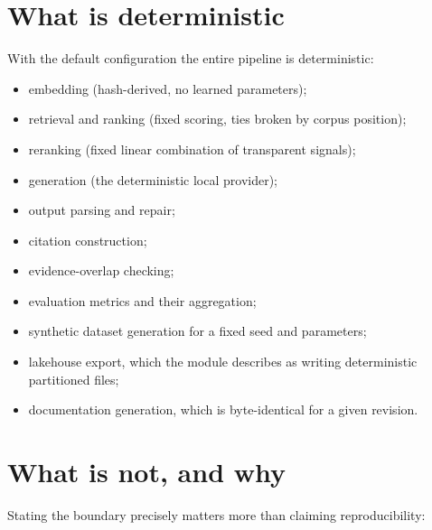 \section{What is deterministic}

With the default configuration the entire pipeline is deterministic:

\begin{itemize}[nosep]
  \item embedding (hash-derived, no learned parameters);
  \item retrieval and ranking (fixed scoring, ties broken by corpus position);
  \item reranking (fixed linear combination of transparent signals);
  \item generation (the deterministic local provider);
  \item output parsing and repair;
  \item citation construction;
  \item evidence-overlap checking;
  \item evaluation metrics and their aggregation;
  \item synthetic dataset generation for a fixed seed and parameters;
  \item lakehouse export, which the module describes as writing deterministic
    partitioned files;
  \item documentation generation, which is byte-identical for a given revision.
\end{itemize}

\section{What is not, and why}

Stating the boundary precisely matters more than claiming reproducibility:

